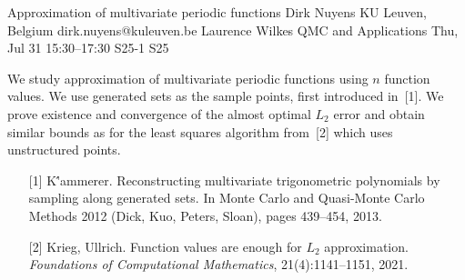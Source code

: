 \begin{talk}
  {Approximation of multivariate periodic functions}%
  {Dirk Nuyens}%
  {KU Leuven, Belgium}%
  {dirk.nuyens@kuleuven.be}%
  {Laurence Wilkes}%
  {QMC and Applications}%
  {Thu, Jul 31 15:30–17:30}%
  {S25-1}%
  {S25}%
				
			
  We study approximation of multivariate periodic functions using $n$
  function values. We use generated sets as the sample points, first
  introduced in~[1]. We prove existence and convergence of the almost
  optimal $L_2$ error and obtain similar bounds as for the least squares
  algorithm from~[2] which uses unstructured points.

\medskip

\begin{enumerate}
  \item[{[1]}]
    K{\''a}mmerer.
    Reconstructing multivariate trigonometric polynomials by sampling along generated sets.
    In Monte Carlo and Quasi-Monte Carlo Methods 2012 (Dick, Kuo, Peters, Sloan), pages 439--454, 2013.
  \item[{[2]}]
    Krieg, Ullrich.
    Function values are enough for $L_2$ approximation.
    \emph{Foundations of Computational Mathematics}, 21(4):1141--1151, 2021.
\end{enumerate}

\end{talk}


